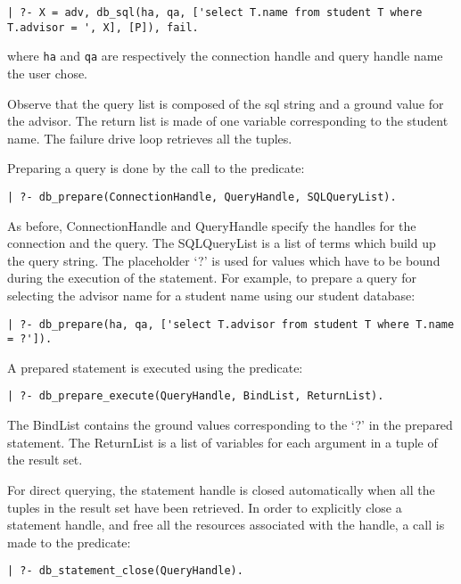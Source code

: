 \begin{verbatim}
| ?- X = adv, db_sql(ha, qa, ['select T.name from student T where 
T.advisor = ', X], [P]), fail.
\end{verbatim}

where {\tt ha} and {\tt qa} are respectively the connection handle and query
handle name the user chose.

Observe that the query list is composed of the sql string and a ground value
for the advisor. The return list is made of one variable corresponding to
the student name. The failure drive loop retrieves all the tuples.

Preparing a  query is done by the call to the predicate:

\begin{verbatim}
| ?- db_prepare(ConnectionHandle, QueryHandle, SQLQueryList).
\end{verbatim}

As before, ConnectionHandle and QueryHandle specify the handles for
the connection and the query. The SQLQueryList is a list of terms which
build up the query string. The placeholder `?' is used for values which 
have to be bound during the execution of the statement.
For example, to prepare a query for selecting the advisor name for a student
name using our student database:

\begin{verbatim}
| ?- db_prepare(ha, qa, ['select T.advisor from student T where T.name = ?']).
\end{verbatim}

A prepared statement is executed using the predicate:

\begin{verbatim}
| ?- db_prepare_execute(QueryHandle, BindList, ReturnList).
\end{verbatim}

The BindList contains the ground values corresponding to the `?' in
the prepared statement. The ReturnList is a list of variables for
each argument in a tuple of the result set.

For direct querying, the statement handle is closed automatically when
all the tuples in the result set have been retrieved. In order to explicitly
close a statement handle, and free all the resources associated with
the handle, a call is made to the predicate:

\begin{verbatim}
| ?- db_statement_close(QueryHandle).
\end{verbatim}

